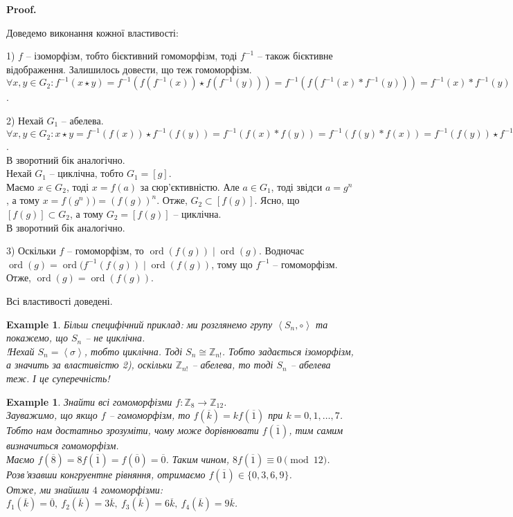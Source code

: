 \documentclass[a4paper, 10pt]{article}
\makeatletter
\theoremstyle{theoremdd}
\theoremstyle{theoremdd}
\theoremstyle{theoremdd}
\theoremstyle{theoremdd}
\theoremstyle{theoremdd}
\newtheorem{example}[theorem]{Example}
\theoremstyle{theoremdd}
\theoremstyle{theoremdd}
\theoremstyle{theoremdd}
\theoremstyle{theoremdd}
\theoremstyle{theoremdd}
\theoremstyle{theoremdd}
\theoremstyle{theoremdd}
\theoremstyle{theoremdd}
\theoremstyle{theoremdd}
\theoremstyle{theoremdd}
\renewenvironment{proof}[1][Proof.\\]{\par
\pushQED{\hfill \qed}%
\normalfont \topsep6\p@\@plus6\p@\relax
\trivlist
\item\relax
{\bfseries
#1\@addpunct{.}}\hspace\labelsep\ignorespaces
}{%
\popQED\endtrivlist\@endpefalse
}
\DeclareMathOperator{\ord}{ord}
\makeatother
\begin{document}
\begin{proof}
Доведемо виконання кожної властивості:
\begin{enumerate}[wide=0pt,label={\arabic*)}]
1) $f$ -- ізоморфізм, тобто бієктивний гомоморфізм, тоді $f^{-1}$ -- також бієктивне відображення. Залишилось довести, що теж гомоморфізм.\\
$\forall x,y \in G_2: f^{-1}(x \star y) = f^{-1}(f(f^{-1}(x)) \star f(f^{-1}(y)))  = f^{-1}(f(f^{-1}(x)*f^{-1}(y))) = f^{-1}(x)*f^{-1}(y)$.

2) Нехай $G_1$ -- абелева. \\
$\forall x,y \in G_2: x \star y = f^{-1}(f(x)) \star f^{-1}(f(y)) = f^{-1}(f(x) * f(y)) = f^{-1}(f(y) * f(x)) = f^{-1}(f(y)) \star f^{-1}(f(x)) = y \star x$.\\
В зворотний бік аналогічно.\\
Нехай $G_1$ -- циклічна, тобто $G_1 = [g]$.\\
Маємо $x \in G_2$, тоді $x = f(a)$ за сюр'єктивністю. Але $a \in G_1$, тоді звідси $a = g^n$, а тому $x = f(g^n)) = (f(g))^n$. Отже, $G_2 \subset [f(g)]$. Ясно, що $[f(g)] \subset G_2$, а тому $G_2 = [f(g)]$ -- циклічна.\\
В зворотний бік аналогічно.

3) Оскільки $f$ -- гомоморфізм, то $\ord(f(g)) \mid \ord(g)$. Водночас $\ord(g) = \ord(f^{-1}(f(g)) \mid \ord(f(g))$, тому що $f^{-1}$ -- гомоморфізм. Отже, $\ord(g) = \ord(f(g))$.
\end{enumerate}
Всі властивості доведені.
\end{proof}

\begin{example}
Більш специфічний приклад: ми розглянемо групу $\left< S_n, \circ \right>$ та покажемо, що $S_n$ -- не циклічна.\\
!Нехай $S_n = \left<\sigma\right>$, тобто циклічна. Тоді $S_n \cong \mathbb{Z}_{n!}$. Тобто задається ізоморфізм, а значить за властивістю 2), оскільки $\mathbb{Z}_{n!}$ -- абелева, то тоді $S_n$ -- абелева теж. І це суперечність!
\end{example}

\begin{example}
Знайти всі гомоморфізми $f \colon \mathbb{Z}_8 \to \mathbb{Z}_{12}$.\\
Зауважимо, що якщо $f$ -- гомоморфізм, то $f(\overline{k}) = k f(\overline{1})$ при $k = 0,1,\dots,7$. Тобто нам достатньо зрозуміти, чому може дорівнювати $f(\overline{1})$, тим самим визначиться гомоморфізм.\\
Маємо $f(\overline{8}) = 8 f(\overline{1}) = f(\overline{0}) = \overline{0}$. Таким чином, $8 f(\overline{1}) \equiv 0 \pmod{12}$.\\
Розв'язавши конгруентне рівняння, отримаємо $f(\overline{1}) \in \{ 0,3,6,9 \}$.\\
Отже, ми знайшли $4$ гомоморфізми: \\
$f_1(\overline{k}) = \overline{0},\ f_2(\overline{k}) = 3\overline{k},\ f_3(\overline{k}) = 6 \overline{k},\ f_4(\overline{k}) = 9 \overline{k}$.
\end{example}
\end{document}
